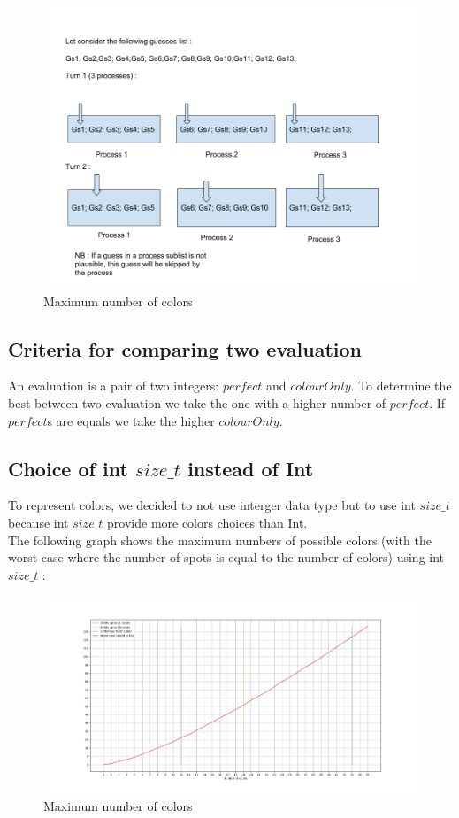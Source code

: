         \begin{figure}[H]
	    \centering
	    \includegraphics[width=15cm] {pTask.png}
	    \caption{Maximum number of colors }
	    \label{plot12}
	\end{figure}
	
	
\subsection{Criteria for comparing two evaluation}
An evaluation is a pair of two integers: $perfect$ and $colourOnly$. To determine the best 
between two evaluation we take the one with a higher number of $perfect$. If $perfect$s are equals
we take the higher $colourOnly$.

\subsection{Choice of int $size\_t$ instead of Int}
To represent colors, we decided to not use interger data type but to use int $size\_t$ because int $size\_t$ provide more colors choices than Int.\\
The following graph shows the maximum numbers of possible colors (with the worst case where the number of spots is equal to the number of colors) using int $size\_t$ : 

        \begin{figure}[H]
	    \centering
	    \includegraphics[width=15cm] {maxColors.png}
	    \caption{Maximum number of colors }
	    \label{plot12}
	\end{figure}

